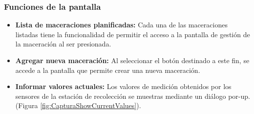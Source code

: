             \subsubsection{Funciones de la pantalla}
                \begin{itemize}
                    \item \textbf{Lista de maceraciones planificadas:} Cada una de las maceraciones listadas tiene la funcionalidad de permitir el acceso a la pantalla de gestión de la maceración al ser presionada.
                    
                    \item \textbf{Agregar nueva maceración:} Al seleccionar el botón destinado a este fin, se accede a la pantalla que permite crear una nueva maceración.
                    
                    \item \textbf{Informar valores actuales:} Los valores de medición obtenidos por los sensores de la estación de recolección se muestras mediante un diálogo por-up. (Figura \ref{fig:CapturaShowCurrentValues}).

                \end{itemize}
                

